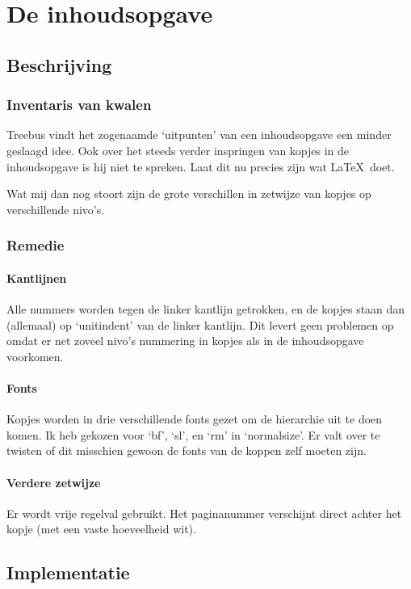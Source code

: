 \documentclass[oldtoc,a4paper,10pt]{rapport3}
\begin{document}
 
\section{De inhoudsopgave}
 
\subsection{Beschrijving}
\subsubsection{Inventaris van kwalen}
Treebus vindt het zogenaamde `uitpunten' van een inhoudsopgave een
minder geslaagd idee. Ook over het steeds verder inspringen van kopjes
in de inhoudsopgave is hij niet te spreken. Laat dit nu precies zijn
wat \LaTeX\ doet.
 
Wat mij dan nog stoort zijn de grote verschillen in zetwijze van
kopjes op verschillende nivo's.
 
\subsubsection{Remedie}
 
\paragraph{Kantlijnen}
Alle nummers worden tegen de linker kantlijn getrokken, en de kopjes
staan dan (allemaal) op `unitindent' van de linker kantlijn. Dit
levert geen problemen op omdat er net zoveel nivo's nummering in
kopjes als in de inhoudsopgave voorkomen.
 
\paragraph{Fonts}
Kopjes worden in drie verschillende fonts gezet om de hierarchie uit
te doen komen. Ik heb gekozen voor `bf', `sl', en `rm' in
`normalsize'. Er valt over te twisten of dit misschien gewoon de fonts
van de koppen zelf moeten zijn.
 
\paragraph{Verdere zetwijze}
Er wordt vrije regelval gebruikt. Het paginanummer verschijnt direct
achter het kopje (met een vaste hoeveelheid wit).
 
\subsection{Implementatie}
 
\end{document}
